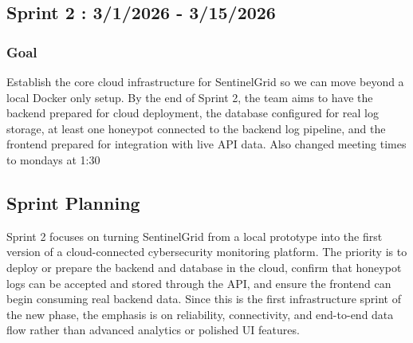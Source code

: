 \documentclass{article}
\begin{document}
\subsection{Sprint 2 : 3/1/2026 - 3/15/2026}
\subsubsection{Goal}
Establish the core cloud infrastructure for SentinelGrid so we can move beyond a local Docker only setup. By the end of Sprint 2, the team aims to have the backend prepared for cloud deployment, the database configured for real log storage, at least one honeypot connected to the backend log pipeline, and the frontend prepared for integration with live API data. 
Also changed meeting times to mondays at 1:30
\subsection{Sprint Planning}
Sprint 2 focuses on turning SentinelGrid from a local prototype into the first version of a cloud-connected cybersecurity monitoring platform. The priority is to deploy or prepare the backend and database in the cloud, confirm that honeypot logs can be accepted and stored through the API, and ensure the frontend can begin consuming real backend data. Since this is the first infrastructure sprint of the new phase, the emphasis is on reliability, connectivity, and end-to-end data flow rather than advanced analytics or polished UI features.
\end{document}

